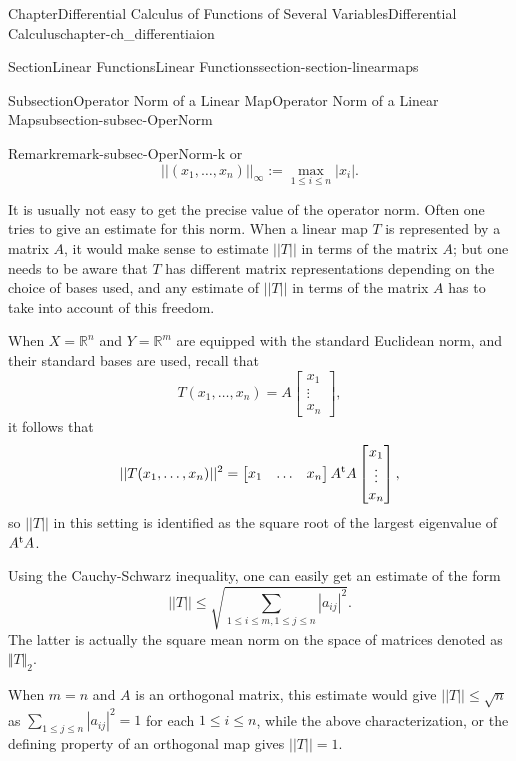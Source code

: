 \documentclass[oneside,10pt,]{book}
\numberwithin{equation}{section}
\newcommand{\amp}{&}
\begin{document}
\begin{chapterptx}{Chapter}{Differential Calculus of Functions of Several Variables}{}{Differential Calculus}{}{}{chapter-ch_differentiaion}
\begin{sectionptx}{Section}{Linear Functions}{}{Linear Functions}{}{}{section-section-linearmaps}
\begin{subsectionptx}{Subsection}{Operator Norm of a Linear Map}{}{Operator Norm of a Linear Map}{}{}{subsection-subsec-OperNorm}
\begin{remark}{Remark}{}{remark-subsec-OperNorm-k}
or%
\begin{equation*}
||(x_{1}, \ldots, x_{n})||_{\infty} :=\max_{1\le i\le n}|x_{i}|.
\end{equation*}
%
\par
It is usually not easy to get the precise value of the operator norm. Often one tries to give an estimate for this norm. When a linear map \(T\) is represented by a matrix \(A\), it would make sense to estimate \(||T||\) in terms of the matrix \(A\); but one needs to be aware that  \(T\) has different matrix representations depending on the choice of bases used, and any estimate of   \(||T||\) in terms of the matrix \(A\) has to take into account of this freedom.%
\par
When \(X=\mathbb R^{n}\) and \(Y=\mathbb R^{m}\) are equipped with the standard Euclidean norm, and their standard bases are used, recall that%
\begin{equation*}
T(x_{1}, \ldots, x_{n})=A\begin{bmatrix} x_{1} \\ \vdots \\ x_{n} \end{bmatrix},
\end{equation*}
it follows that%
\begin{equation*}
||T(x_{1}, \ldots, x_{n})||^{2}= \begin{bmatrix} x_{1} \amp \ldots \amp x_{n} \end{bmatrix}A^{\rm t}A
\begin{bmatrix} x_{1} \\ \vdots \\ x_{n} \end{bmatrix},
\end{equation*}
so \(||T||\) in this setting is identified as the square root of the largest eigenvalue of \(A^{\rm t}A\).%
\par
Using the Cauchy-Schwarz inequality, one can easily get an estimate of the form%
\begin{equation*}
||T||\le \sqrt{\sum_{1\le i \le m, 1\le j \le n} |a_{ij}|^{2}}.
\end{equation*}
The latter is actually the square mean norm on the space of matrices denoted as \(\Vert T\Vert_2\).%
\par
When \(m=n\) and \(A\) is an orthogonal matrix, this estimate would give \(||T||\le \sqrt{n}\) as \(\sum_{1\le j \le n} |a_{ij}|^{2}=1\) for each \(1\le i \le n\), while the above characterization, or the defining property of an orthogonal map gives \(||T||=1\).%
\end{remark}

\end{subsectionptx}
\end{sectionptx}
\end{chapterptx}
\end{document}
